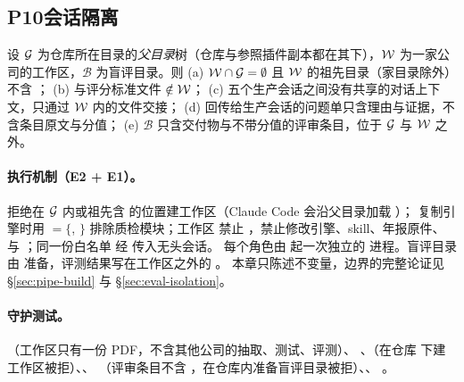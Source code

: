 \subsection{P10\quad 会话隔离}
\label{sec:pr-p10}

\begin{invariant}[隔离边界]\label{inv:pr-isolation}
设 $\mathcal{G}$ 为仓库所在目录的\emph{父目录}树（仓库与参照插件副本都在其下），$\mathcal{W}$ 为一家公司的工作区，$\mathcal{B}$ 为盲评目录。则
(a) $\mathcal{W}\cap\mathcal{G}=\emptyset$ 且 $\mathcal{W}$ 的祖先目录（家目录除外）不含 ；
(b)  与评分标准文件 $\notin\mathcal{W}$；
(c) 五个生产会话之间没有共享的对话上下文，只通过 $\mathcal{W}$ 内的文件交接；
(d) 回传给生产会话的问题单只含理由与证据，不含条目原文与分值；
(e) $\mathcal{B}$ 只含交付物与不带分值的评审条目，位于 $\mathcal{G}$ 与 $\mathcal{W}$ 之外。
\end{invariant}

\paragraph{执行机制（E2 + E1）。} 拒绝在 $\mathcal{G}$ 内或祖先含  的位置建工作区（Claude Code 会沿父目录加载 ）；
 复制引擎时用 ${}=\{$, $\}$ 排除质检模块；工作区 
禁止 ，禁止修改引擎、skill、年报原件、 与 ；同一份白名单  经  传入无头会话。
每个角色由  起一次独立的  进程。盲评目录由  准备，评测结果写在工作区之外的 。
本章只陈述不变量，边界的完整论证见 \S\ref{sec:pipe-build} 与 \S\ref{sec:eval-isolation}。

\paragraph{守护测试。}（工作区只有一份 PDF，不含其他公司的抽取、测试、评测）、
、（在仓库  下建工作区被拒）、、
（评审条目不含 ，在仓库内准备盲评目录被拒）、、
。

